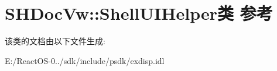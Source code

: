 \hypertarget{class_s_h_doc_vw_1_1_shell_u_i_helper}{}\section{S\+H\+Doc\+Vw\+:\+:Shell\+U\+I\+Helper类 参考}
\label{class_s_h_doc_vw_1_1_shell_u_i_helper}


该类的文档由以下文件生成\+:\begin{DoxyCompactItemize}
\item 
E\+:/\+React\+O\+S-\/0../sdk/include/psdk/exdisp.\+idl\end{DoxyCompactItemize}
